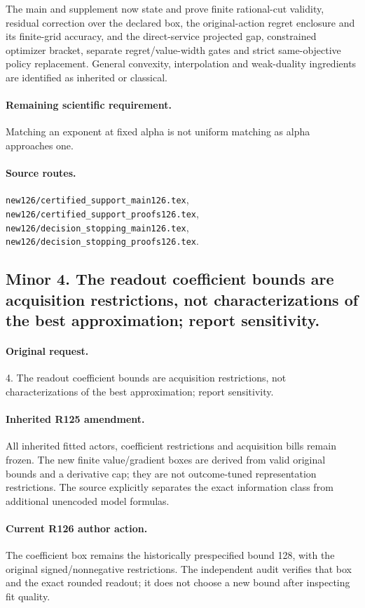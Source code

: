 The main and supplement now state and prove finite rational-cut validity, residual correction over the declared box, the original-action regret enclosure and its finite-grid accuracy, and the direct-service projected gap, constrained optimizer bracket, separate regret/value-width gates and strict same-objective policy replacement. General convexity, interpolation and weak-duality ingredients are identified as inherited or classical.\par

\paragraph{Remaining scientific requirement.} Matching an exponent at fixed alpha is not uniform matching as alpha approaches one.

\paragraph{Source routes.} \nolinkurl{new126/certified_support_main126.tex}, \nolinkurl{new126/certified_support_proofs126.tex}, \nolinkurl{new126/decision_stopping_main126.tex}, \nolinkurl{new126/decision_stopping_proofs126.tex}.

\subsection*{Minor 4. The readout coefficient bounds are acquisition restrictions, not characterizations of the best approximation; report sensitivity.}
\paragraph{Original request.} 4. The readout coefficient bounds are acquisition restrictions, not characterizations of the best approximation; report sensitivity.

\paragraph{Inherited R125 amendment.} All inherited fitted actors, coefficient restrictions and acquisition bills remain frozen. The new finite value/gradient boxes are derived from valid original bounds and a derivative cap; they are not outcome-tuned representation restrictions. The source explicitly separates the exact information class from additional unencoded model formulas.

\paragraph{Current R126 author action.} The coefficient box remains the historically prespecified bound 128, with the original signed/nonnegative restrictions. The independent audit verifies that box and the exact rounded readout; it does not choose a new bound after inspecting fit quality.

